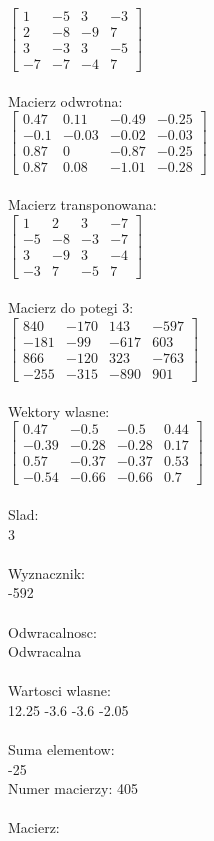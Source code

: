\documentclass[a4paper,12pt]{article}
\begin{document}
$\begin{bmatrix} 1&-5&3&-3\\2&-8&-9&7\\3&-3&3&-5\\-7&-7&-4&7 \end{bmatrix}$
\\
\\
Macierz odwrotna:\\

$\begin{bmatrix} 0.47&0.11&-0.49&-0.25\\-0.1&-0.03&-0.02&-0.03\\0.87&0&-0.87&-0.25\\0.87&0.08&-1.01&-0.28 \end{bmatrix}$
\\
\\
Macierz transponowana:\\

$\begin{bmatrix} 1&2&3&-7\\-5&-8&-3&-7\\3&-9&3&-4\\-3&7&-5&7 \end{bmatrix}$
\\
\\
Macierz do potegi 3:\\

$\begin{bmatrix} 840&-170&143&-597\\-181&-99&-617&603\\866&-120&323&-763\\-255&-315&-890&901 \end{bmatrix}$
\\
\\
Wektory wlasne:\\

$\begin{bmatrix} 0.47&-0.5&-0.5&0.44\\-0.39&-0.28&-0.28&0.17\\0.57&-0.37&-0.37&0.53\\-0.54&-0.66&-0.66&0.7 \end{bmatrix}$
\\
\\
Slad:\\
3
\\
\\
Wyznacznik:\\
-592
\\
\\
Odwracalnosc:\\
Odwracalna
\\
\\
Wartosci wlasne:\\
12.25 -3.6 -3.6 -2.05
\\
\\
Suma elementow:\\
-25
\\
\newpage
Numer macierzy:
405
\\
\\
Macierz:\\
\end{document}
